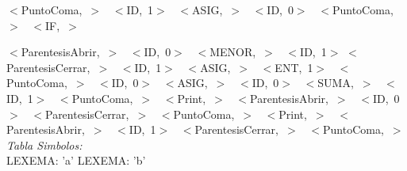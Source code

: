 \documentclass[a4paper, 12pt]{article}
\begin{document}
 \noindent
 \mbox{$<$PuntoComa, $>$ }
 \mbox{$<$ID, 1$>$ }
 \mbox{$<$ASIG, $>$ }
 \mbox{$<$ID, 0$>$ }
 \mbox{$<$PuntoComa, $>$ }
 \mbox{$<$IF, $>$ }
 
 \noindent
 \mbox{$<$ParentesisAbrir, $>$ }
 \mbox{$<$ID, 0$>$ }
 \mbox{$<$MENOR, $>$ }
 \mbox{$<$ID, 1$>$}
 \mbox{$<$ParentesisCerrar, $>$ }
 \mbox{$<$ID, 1$>$ }
 \mbox{$<$ASIG, $>$ }
 \mbox{$<$ENT, 1$>$ }
 \mbox{$<$PuntoComa, $>$ }
 \mbox{$<$ID, 0$>$ }
 \mbox{$<$ASIG, $>$ }
 \mbox{$<$ID, 0$>$ }
 \mbox{$<$SUMA, $>$ }
 \mbox{$<$ID, 1$>$ }
 \mbox{$<$PuntoComa, $>$ }
 \mbox{$<$Print, $>$ }
 \mbox{$<$ParentesisAbrir, $>$ }
 \mbox{$<$ID, 0$>$ }
 \mbox{$<$ParentesisCerrar, $>$ }
 \mbox{$<$PuntoComa, $>$ }
 \mbox{$<$Print, $>$ }
 \mbox{$<$ParentesisAbrir, $>$ }
 \mbox{$<$ID, 1$>$ }
 \mbox{$<$ParentesisCerrar, $>$ }
 \mbox{$<$PuntoComa, $>$}\medskip\\
\emph{Tabla Simbolos:}\\ 
  LEXEMA: 'a'
  LEXEMA: 'b' 
\end{document}
